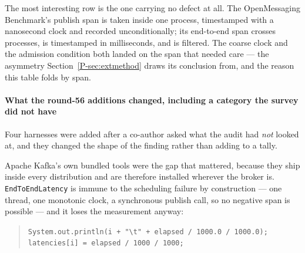 \documentclass[10pt,journal,onecolumn]{IEEEtran}
\newcommand{\kafka}{Kafka}
\newcommand{\mainGuard}{\ref{P-sec:extmethod}}            %
\begin{document}
\begin{table}[h]
\caption[Audited harnesses, one row per span rather than per tool]{Audited harnesses, one row per span rather than per tool. \textnormal{\textit{Filter}} drops what its
comparison excludes, and the comparison is printed with it: $>0$ deletes every sample that
computes to exactly zero, which on a path shorter than the resolution is most of them, while $\geq 0$ keeps
those and drops only the negative spans. \textnormal{\textit{substitute}} replaces an inverted interval with a constant;
\textnormal{\textit{refused by own library}} means the recording library returns a refusal the caller never
checks; \textnormal{\textit{counts}} means the disposal is exposed in the output. The OpenMessaging
Benchmark appears twice, because it treats its two spans differently and that difference is
the finding of Section~\mainGuard{}. Sources, in row order: \registryTableSources. This table and
this list are generated from \texttt{harness\_registry.csv} at build time.}
\label{tab:registry}
\centering
\footnotesize

\end{table}

The most interesting row is the one carrying no defect at all. The OpenMessaging Benchmark's
publish span is taken inside one process, timestamped with a nanosecond clock and recorded
unconditionally; its end-to-end span crosses processes, is timestamped in milliseconds, and is
filtered. The coarse clock and the admission condition both landed on the span that needed care --- the
asymmetry Section~\mainGuard{} draws its conclusion from, and the reason this table folds by span.

\paragraph{What the round-56 additions changed, including a category the survey did not have}
Four harnesses were added after a co-author asked what the audit had \emph{not} looked at, and
they changed the shape of the finding rather than adding to a tally.

Apache \kafka{}'s own bundled tools were the gap that mattered, because they ship inside every
distribution and are therefore installed wherever the broker is. \texttt{EndToEndLatency} is
immune to the scheduling failure by construction --- one thread, one monotonic clock, a synchronous publish call, so
no negative span is possible --- and it loses the measurement anyway:

\begin{quote}
\texttt{System.out.println(i + "\textbackslash t" + elapsed / 1000.0 / 1000.0);}\\
\texttt{latencies[i] = elapsed / 1000 / 1000;}
\end{quote}
\end{document}
